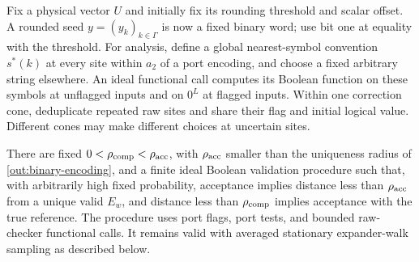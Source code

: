 Fix a physical vector $U$ and initially fix its rounding threshold and
scalar offset. A rounded seed $y=(y_k)_{k\in\Gamma}$ is now a fixed
binary word; use bit one at equality with the threshold. For analysis, define a global nearest-symbol convention
$s^*(k)$ at every site within $a_2$ of a port encoding, and choose a
fixed arbitrary string elsewhere. An ideal functional call computes
its Boolean function on these symbols at unflagged inputs and on
$0^L$ at flagged inputs. Within one correction cone, deduplicate repeated
raw sites and share their flag and initial logical value. Different
cones may make different choices at uncertain sites.

\begin{lemma}\label{out:validation}
There are fixed $0<\rho_{\rm comp}<\rho_{\rm acc}$, with
$\rho_{\rm acc}$ smaller than the uniqueness radius of
\eqref{out:binary-encoding}, and a finite ideal Boolean validation
procedure such that, with arbitrarily high fixed probability, acceptance
implies distance less than $\rho_{\rm acc}$ from a unique valid $E_w$,
and distance less than $\rho_{\rm comp}$ implies acceptance with the
true reference. The procedure uses port flags, port tests, and bounded
raw-checker functional calls. It remains valid with averaged stationary
expander-walk sampling as described below.
\end{lemma}
